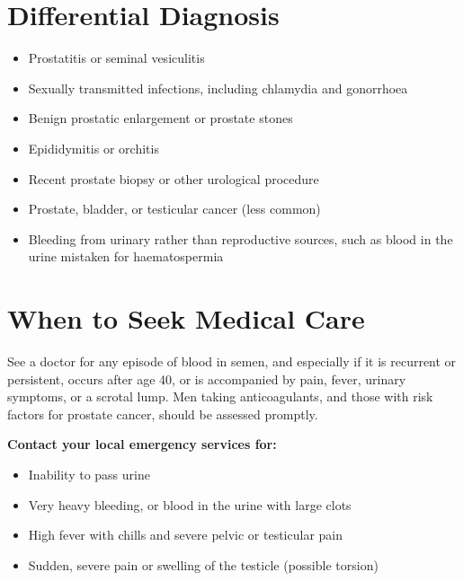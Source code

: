 \section*{Differential Diagnosis}
\begin{itemize}
    \item Prostatitis or seminal vesiculitis
    \item Sexually transmitted infections, including chlamydia and gonorrhoea
    \item Benign prostatic enlargement or prostate stones
    \item Epididymitis or orchitis
    \item Recent prostate biopsy or other urological procedure
    \item Prostate, bladder, or testicular cancer (less common)
    \item Bleeding from urinary rather than reproductive sources, such as blood in the urine mistaken for haematospermia
\end{itemize}

\section*{When to Seek Medical Care}
See a doctor for any episode of blood in semen, and especially if it is recurrent or persistent, occurs after age 40, or is accompanied by pain, fever, urinary symptoms, or a scrotal lump. Men taking anticoagulants, and those with risk factors for prostate cancer, should be assessed promptly.

\textbf{Contact your local emergency services for:}
\begin{itemize}
    \item Inability to pass urine
    \item Very heavy bleeding, or blood in the urine with large clots
    \item High fever with chills and severe pelvic or testicular pain
    \item Sudden, severe pain or swelling of the testicle (possible torsion)
\end{itemize}

